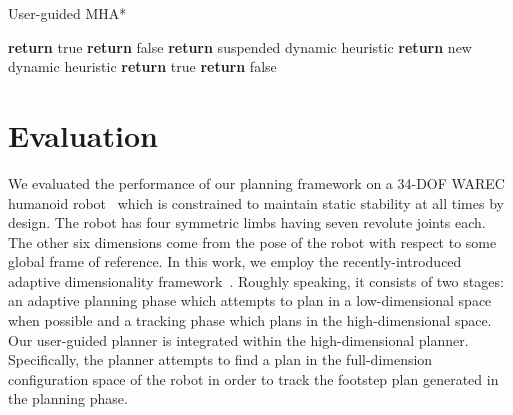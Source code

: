 \documentclass[conference]{IEEEtran}
\begin{document}
\begin{algorithm}[tb]
\caption{User-guided MHA*}
\label{alg:instantiation}	
\begin{algorithmic}[1]
\small
		\State \textbf{return} true
	\Else
		\State \textbf{return} false
	\EndIf
\EndFunction
%	
\vspace{2mm}
%
%
		\State \textbf{return}  {suspended dynamic heuristic}
	\Else
		\State \textbf{return}	{new dynamic heuristic}
	\EndIf
\EndFunction 
%	
\vspace{2mm}
%
%
		\State \textbf{return} true
	\Else
		\State \textbf{return} false
	\EndIf
\EndFunction 
%	
\vspace{2mm}
%
	\Else 	{}
		\Else
		\EndIf
	\EndIf
\EndFunction
\end{algorithmic}
\end{algorithm}

\section{Evaluation }
\label{sec:eval}
We evaluated the performance of our planning framework on a 34-DOF WAREC humanoid robot~\cite{MHSetal15} 
which is constrained to maintain static stability at all times by design. The robot has four symmetric limbs having seven revolute joints each. The other six dimensions come from the pose of the robot with respect to some global frame of reference. 
In this work, we employ the recently-introduced adaptive dimensionality framework~\cite{GCBSL11, GSL12, GSL13}.
Roughly speaking,  it consists of two stages: an adaptive planning phase which attempts to plan in a low-dimensional space when possible and a tracking phase which plans in the high-dimensional space.
Our user-guided planner is integrated within the high-dimensional planner.
Specifically, the planner attempts to find a plan in the full-dimension configuration space of the robot in order to track the footstep plan generated in the planning phase. 
\end{document}
